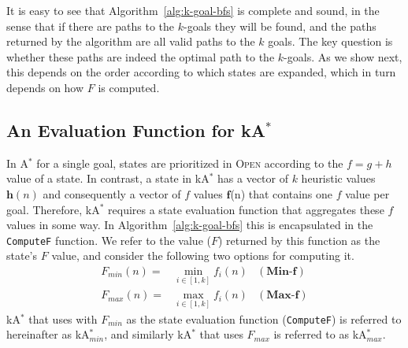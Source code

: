 \documentclass{aicom2e}
\newcommand{\astar}{A$^*$}
\newcommand{\kastar}{kA$^*$}
\newcommand{\kastarmin}{kA$^*_{min}$}
\newcommand{\kastarmax}{kA$^*_{max}$}
\newcommand{\minf}{Min-f}
\newcommand{\maxf}{Max-f}
\newcommand{\open}{\textsc{Open}}
\begin{document}
It is easy to see that Algorithm~\ref{alg:k-goal-bfs} is complete and sound, in the sense that if there are paths to the $k$-goals they will be found, and the paths returned by the algorithm are all valid paths to the $k$ goals. The key question is whether these paths are indeed the optimal path to the $k$-goals.
As we show next, this depends on the order according to which states are expanded, 
which in turn depends on how $F$ is computed. %


\subsection{An Evaluation Function for \kastar{}}
In \astar{} for a single goal, states are prioritized in \open{} according to the $f=g+h$ value of a state. 
In contrast, a state in \kastar{} has a vector of $k$ heuristic values $\textbf{h}(n)$ and 
consequently a vector of $f$ values $\textbf{f}$(n) that contains one $f$ value per goal. Therefore, \kastar{} requires a state evaluation function that aggregates these $f$ values in some way. In Algorithm~\ref{alg:k-goal-bfs} this is encapsulated in the {\tt ComputeF} function. We refer to the value ($F$) returned by this function as the state's $F$ value, and consider the following two options for computing it. 
\begin{align}
F_{min}(n)=&\min_{i\in [1,k]}f_i(n) & (\textbf{\minf})\\ 
F_{max}(n)=&\max_{i\in [1,k]}f_i(n) & (\textbf{\maxf}) 
\end{align}
\kastar{} that uses with $F_{min}$ as the state evaluation function ({\tt ComputeF}) 
is referred to hereinafter as \kastarmin{}, and similarly \kastar{} that uses $F_{max}$ is referred to 
as \kastarmax{}.
 

\end{document}
